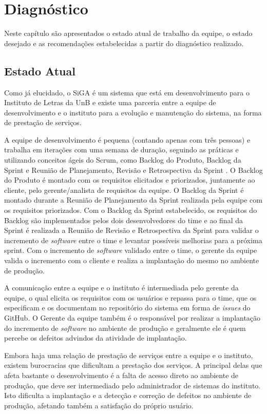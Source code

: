 \chapter{Diagnóstico} \label{cap:diagnostico}

Neste capítulo são apresentados o estado atual de trabalho da equipe, o estado desejado e as recomendações estabelecidas
a partir do diagnóstico realizado.

\section{Estado Atual}

Como já elucidado, o SiGA é um sistema que está em desenvolvimento para o Instituto de Letras da UnB
e existe uma parceria entre a equipe de desenvolvimento e o instituto para a evolução e manutenção do sistema,
na forma de prestação de serviços. 

A equipe de desenvolvimento é pequena (contando apenas com três pessoas) e trabalha em iterações com uma semana de duração,
seguindo as práticas e utilizando conceitos ágeis do Scrum, como Backlog do Produto, Backlog da Sprint e
Reunião de Planejamento, Revisão e Retrospectiva da Sprint \cite{scrum}.
O Backlog do Produto é montado com os requisitos elicitados e priorizados, juntamente ao cliente,
pelo gerente/analista de requisitos da equipe.
O Backlog da Sprint é montado durante a Reunião de Planejamento da Sprint realizada pela equipe com os requisitos
priorizados. Com o Backlog da Sprint estabelecido, os requisitos do Backlog são implementados pelos dois desenvolvedores do time
e ao final da Sprint é realizada a Reunião de Revisão e Retrospectiva da Sprint para validar o incremento de \textit{software} entre 
o time e levantar possíveis melhorias para a próxima sprint. Com o incremento de \textit{software} validado entre o time, o gerente
da equipe valida o incremento com o cliente e realiza a implantação do mesmo no ambiente de produção.

A comunicação entre a equipe e o instituto é intermediada pelo gerente da equipe, o qual elicita os requisitos 
com os usuários e repassa para o time, que os especificam e os documentam no repositório do sistema em forma de
\textit{issues} do GitHub. O Gerente da equipe também é o responsável por realizar a implantação do incremento de
\textit{software} no ambiente de produção e geralmente ele é quem percebe os defeitos advindos da atividade de implantação.

Embora haja uma relação de prestação de serviços entre a equipe e o instituto, existem burocracias que dificultam a prestação
dos serviços. A principal delas que afeta bastante o desenvolvimento é a falta de acesso direto ao ambiente de produção, que deve 
ser intermediado pelo administrador de sistemas do instituto. Isto dificulta a implantação e a detecção e correção de defeitos 
no ambiente de produção, afetando também a satisfação do próprio usuário.

